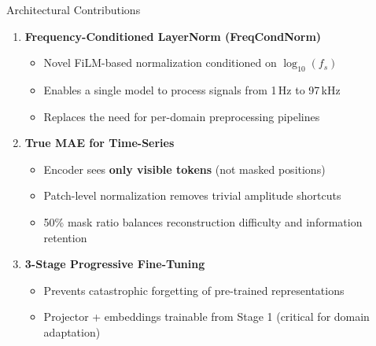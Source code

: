 \documentclass[aspectratio=169, 11pt]{beamer}
\begin{document}
\begin{frame}{Architectural Contributions}

\begin{enumerate}
    \item \textbf{Frequency-Conditioned LayerNorm (FreqCondNorm)}
    \begin{itemize}
        \item Novel FiLM-based normalization conditioned on $\log_{10}(f_s)$
        \item Enables a single model to process signals from 1\,Hz to 97\,kHz
        \item Replaces the need for per-domain preprocessing pipelines
    \end{itemize}

    \vspace{0.3cm}
    \item \textbf{True MAE for Time-Series}
    \begin{itemize}
        \item Encoder sees \textbf{only visible tokens} (not masked positions)
        \item Patch-level normalization removes trivial amplitude shortcuts
        \item 50\% mask ratio balances reconstruction difficulty and information retention
    \end{itemize}

    \vspace{0.3cm}
    \item \textbf{3-Stage Progressive Fine-Tuning}
    \begin{itemize}
        \item Prevents catastrophic forgetting of pre-trained representations
        \item Projector + embeddings trainable from Stage 1 (critical for domain adaptation)
    \end{itemize}
\end{enumerate}
\end{frame}

\end{document}
